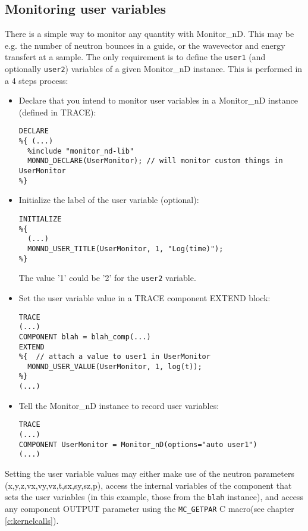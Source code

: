 \subsection{Monitoring user variables}
\label{s:monnd:user}

There is a simple way to monitor any quantity with Monitor\_nD. This may be e.g. the number of neutron bounces in a guide, or the wavevector and energy transfert at a sample. The only requirement is to define the \verb+user1+ (and optionally \verb+user2+) variables of a given Monitor\_nD instance. This is performed in a 4 steps process:
\begin{itemize}
\item Declare that you intend to monitor user variables in a Monitor\_nD instance (defined in TRACE):
\begin{verbatim}
DECLARE
%{ (...)
  %include "monitor_nd-lib"
  MONND_DECLARE(UserMonitor); // will monitor custom things in UserMonitor
%}
\end{verbatim}
\item Initialize the label of the user variable (optional):
\begin{verbatim}
INITIALIZE
%{
  (...)
  MONND_USER_TITLE(UserMonitor, 1, "Log(time)");
%}
\end{verbatim}
The value '1' could be '2' for the \verb+user2+ variable.
\item Set the user variable value in a TRACE component EXTEND block:
\begin{verbatim}
TRACE
(...)
COMPONENT blah = blah_comp(...)
EXTEND
%{  // attach a value to user1 in UserMonitor
  MONND_USER_VALUE(UserMonitor, 1, log(t));
%}
(...)
\end{verbatim}
\item Tell the Monitor\_nD instance to record user variables:
\begin{verbatim}
TRACE
(...)
COMPONENT UserMonitor = Monitor_nD(options="auto user1")
(...)
\end{verbatim}
\end{itemize}
Setting the user variable values may either make use of the neutron parameters (x,y,z,vx,vy,vz,t,sx,sy,sz,p), access the internal variables of the component that sets the user variables (in this example, those from the \verb+blah+ instance), and access any component OUTPUT parameter  using the \verb+MC_GETPAR+ C macro(see chapter \ref{c:kernelcalls}).

